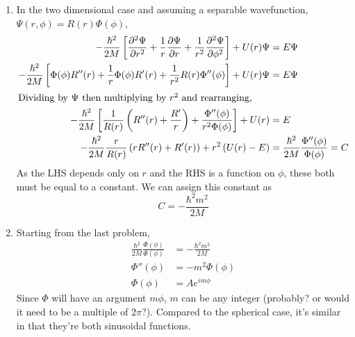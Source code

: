 \documentclass{homework}
\begin{document}
\begin{enumerate}
		\item In the two dimensional case and assuming a separable wavefunction, $\Psi(r, \phi) = R(r) \Phi(\phi)$, \begin{align*}
			-\frac{\hbar^2}{2M} \left[ \pdv[2]{\Psi}{r} + \frac{1}{r} \pdv{\Psi}{r} + \frac{1}{r^2} \pdv[2]{\Psi}{\phi} \right] + U(r) \Psi & = E \Psi \\
			- \frac{\hbar^2}{2M} \left[ \Phi(\phi) R''(r) + \frac{1}{r} \Phi(\phi) R'(r) + \frac{1}{r^2} R(r) \Phi''(\phi)\right] + U(r) \Psi & = E \Psi \\
			\intertext{Dividing by $\Psi$ then multiplying by $r^2$ and rearranging,}
			-\frac{\hbar^2}{2M} \left[\frac{1}{R(r)} \left(R''(r) + \frac{R'}{r}\right)  + \frac{\Phi''(\phi)}{r^2 \Phi(\phi)} \right] + U(r) & = E \\
			- \frac{\hbar^2}{2M} \frac{r}{R(r)} \left(rR''(r) + R'(r)\right) + r^2 \left(U(r) - E\right) & = \frac{\hbar^2}{2M} \frac{\Phi''(\phi)}{\Phi(\phi)} = C
		\end{align*}
As the LHS depends only on $r$ and the RHS is a function on $\phi$, these both must be equal to a constant. We can assign this constant as
$$				C  = -\frac{\hbar^2 m^2}{2M}$$
		\item Starting from the last problem, \begin{align*}
			\frac{ \hbar^2 }{2M} \frac{\Phi(\phi)}{\Phi(\phi)} & = - \frac{\hbar^2 m^2}{2M} \\
			\Phi''(\phi) & = -m^2\Phi(\phi) \\
			\Phi(\phi) & = Ae^{im\phi}
		\end{align*}
	Since $\Phi$ will have an argument $m \phi$, $m$ can be any integer (probably? or would it need to be a multiple of $2\pi$?). Compared to the spherical case, it's similar in that they're both sinusoidal functions.
	\end{enumerate}
\end{document}
